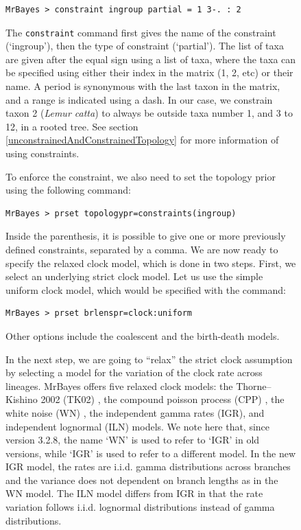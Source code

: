 \documentclass[12pt]{book}
\newcommand{\ttt}[1]{\texttt{#1}}
\begin{document}
\begin{figure}[h]
\small
\begin{singlespacing}
\begin{verbatim}
MrBayes > constraint ingroup partial = 1 3-. : 2
\end{verbatim}
\end{singlespacing}
\normalsize

The \ttt{constraint} command first gives the name of the constraint (`ingroup'), then the type of
constraint (`partial'). The list of taxa are given after the equal sign using a list of taxa, where
the taxa can be specified using either their index in the matrix (1, 2, etc) or their name. A
period is synonymous with the last taxon in the matrix, and a range is indicated using a dash. In
our case, we constrain taxon 2 (\textit{Lemur catta}) to always be outside taxa number 1, and 3 to
12, in a rooted tree. See section \ref{unconstrainedAndConstrainedTopology} for more information of
using constraints.

To enforce the constraint, we also need to set the topology prior using the following command:

\small
\begin{singlespacing}
\begin{verbatim}
MrBayes > prset topologypr=constraints(ingroup)
\end{verbatim}
\end{singlespacing}
\normalsize

Inside the parenthesis, it is possible to give one or more previously defined constraints,
separated by a comma. We are now ready to specify the relaxed clock model, which is done in two
steps. First, we select an underlying strict clock model. Let us use the simple uniform clock
model, which would be specified with the command:

\small
\begin{singlespacing}
\begin{verbatim}
MrBayes > prset brlenspr=clock:uniform
\end{verbatim}
\end{singlespacing}
\normalsize

Other options include the coalescent and the birth-death models. 

In the next step, we are going to ``relax'' the strict clock assumption by selecting a model for the variation of the clock rate across lineages. 
MrBayes offers five relaxed clock models: the Thorne--Kishino 2002 (TK02) \citep{thorne02}, the
compound poisson process (CPP) \citep{huelsenbeck00a}, the white noise (WN) \citep{lepage07}, the independent gamma rates (IGR), and independent lognormal (ILN) \citep{drummond06} models. 
We note here that, since version 3.2.8, the name `WN' is used to refer to `IGR' in old versions, while `IGR' is used to refer to a different model. In the new IGR model, the rates are i.i.d. gamma distributions across branches and the variance does not dependent on branch lengths as in the WN model.
The ILN model differs from IGR in that the rate variation follows i.i.d. lognormal distributions instead of gamma distributions.


\end{figure}
\end{document}
